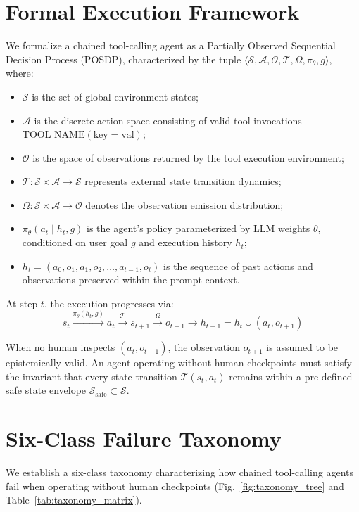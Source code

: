 \documentclass[conference]{IEEEtran}
\begin{document}
\section{Formal Execution Framework}
We formalize a chained tool-calling agent as a Partially Observed Sequential Decision Process (POSDP), characterized by the tuple $\langle \mathcal{S}, \mathcal{A}, \mathcal{O}, \mathcal{T}, \Omega, \pi_\theta, g \rangle$, where:
\begin{itemize}
    \item $\mathcal{S}$ is the set of global environment states;
    \item $\mathcal{A}$ is the discrete action space consisting of valid tool invocations $\text{TOOL\_NAME}(\text{key}=\text{val})$;
    \item $\mathcal{O}$ is the space of observations returned by the tool execution environment;
    \item $\mathcal{T}: \mathcal{S} \times \mathcal{A} \to \mathcal{S}$ represents external state transition dynamics;
    \item $\Omega: \mathcal{S} \times \mathcal{A} \to \mathcal{O}$ denotes the observation emission distribution;
    \item $\pi_\theta(a_t \mid h_t, g)$ is the agent's policy parameterized by LLM weights $\theta$, conditioned on user goal $g$ and execution history $h_t$;
    \item $h_t = (a_0, o_1, a_1, o_2, \dots, a_{t-1}, o_t)$ is the sequence of past actions and observations preserved within the prompt context.
\end{itemize}

At step $t$, the execution progresses via:
\begin{equation}
s_t \xrightarrow{\pi_\theta(h_t, g)} a_t \xrightarrow{\mathcal{T}} s_{t+1} \xrightarrow{\Omega} o_{t+1} \xrightarrow{} h_{t+1} = h_t \cup (a_t, o_{t+1})
\label{eq:posdp_step}
\end{equation}

When no human inspects $(a_t, o_{t+1})$, the observation $o_{t+1}$ is assumed to be epistemically valid. An agent operating without human checkpoints must satisfy the invariant that every state transition $\mathcal{T}(s_t, a_t)$ remains within a pre-defined safe state envelope $\mathcal{S}_{\text{safe}} \subset \mathcal{S}$.

\section{Six-Class Failure Taxonomy}
We establish a six-class taxonomy characterizing how chained tool-calling agents fail when operating without human checkpoints (Fig.~\ref{fig:taxonomy_tree} and Table~\ref{tab:taxonomy_matrix}).
\end{document}
